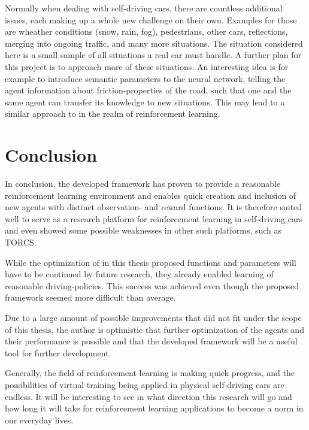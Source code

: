 Normally when dealing with self-driving cars, there are countless additional issues, each making up a whole new challenge on their own. Examples for those are wheather conditions (snow, rain, fog), pedestrians, other cars, reflections, merging into ongoing traffic, and many more situations. The situation considered here is a small sample of all situations a real car must handle. A further plan for this project is to approach more of these situations. An interesting idea is for example to introduce semantic parameters to the neural network, telling the agent information about friction-properties of the road, such that one and the same agent can transfer its knowledge to new situations. This may lead to a similar approach to \cite{chen_infogan:_2016} in the realm of reinforcement learning.

\section {Conclusion}

In conclusion, the developed framework has proven to provide a reasonable reinforcement learning environment and enables quick creation and inclusion of new agents with distinct observation- and reward functions. It is therefore suited well to serve as a research platform for reinforcement learning in self-driving cars and even showed some possible weaknesses in other such platforms, such as TORCS. 

While the optimization of in this thesis proposed functions and parameters will have to be continued by future research, they already enabled learning of reasonable driving-policies. This success was achieved even though the proposed framework seemed more difficult than average.

Due to a large amount of possible improvements that did not fit under the scope of this thesis, the author is optimistic that further optimization of the agents and their performance is possible and that the developed framework will be a useful tool for further development. 

Generally, the field of reinforcement learning is making quick progress, and the possibilities of virtual training being applied in physical self-driving cars are endless.
It will be interesting to see in what direction this research will go and how long it will take for reinforcement learning applications to become a norm in our everyday lives.  



